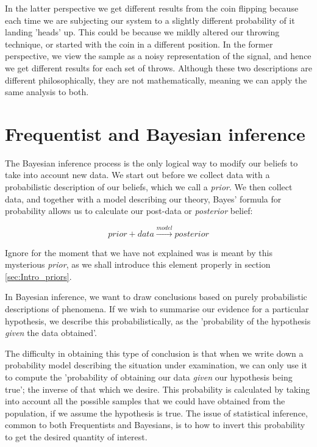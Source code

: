 \documentclass[11pt,fullpage]{book}
\begin{document}
In the latter perspective we get different results from the coin flipping because each time we are subjecting our system to a slightly different probability of it landing 'heads' up. This could be because we mildly altered our throwing technique, or started with the coin in a different position. In the former perspective, we view the sample as a noisy representation of the signal, and hence we get different results for each set of throws. Although these two descriptions are different philosophically, they are not mathematically, meaning we can apply the same analysis to both.

\section{Frequentist and Bayesian inference}
The Bayesian inference process is the only logical way to modify our beliefs to take into account new data. We start out before we collect data with a probabilistic description of our beliefs, which we call a \textit{prior}. We then collect data, and together with a model describing our theory, Bayes' formula for probability allows us to calculate our post-data or \textit{posterior} belief:

\begin{equation}
prior + data \xrightarrow{model} posterior
\end{equation}

Ignore for the moment that we have not explained was is meant by this mysterious \textit{prior}, as we shall introduce this element properly in section \ref{sec:Intro_priors}. 

In Bayesian inference, we want to draw conclusions based on purely probabilistic descriptions of phenomena. If we wish to summarise our evidence for a particular hypothesis, we describe this probabilistically, as the 'probability of the hypothesis \textit{given} the data obtained'. 

The difficulty in obtaining this type of conclusion is that when we write down a probability model describing the situation under examination, we can only use it to compute the 'probability of obtaining our data \textit{given} our hypothesis being true'; the inverse of that which we desire. This probability is calculated by taking into account all the possible samples that we could have obtained from the population, if we assume the hypothesis is true. The issue of statistical inference, common to both Frequentists and Bayesians, is to how to invert this probability to get the desired quantity of interest.
\end{document}
